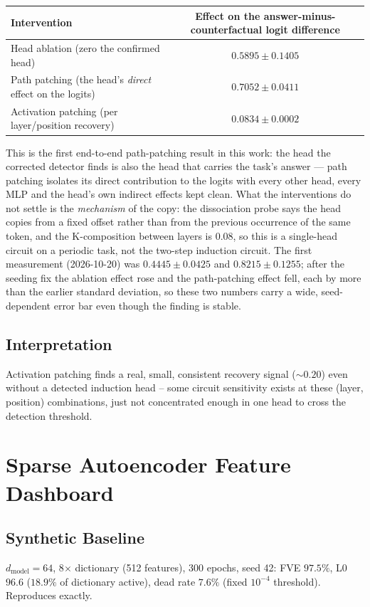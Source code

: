 \documentclass[11pt]{article}
\begin{document}
\begin{center}
\begin{tabular}{lc}
\toprule
Intervention & Effect on the answer-minus-counterfactual logit difference \\
\midrule
Head ablation (zero the confirmed head) & $0.5895 \pm 0.1405$ \\
Path patching (the head's \emph{direct} effect on the logits) & $0.7052 \pm 0.0411$ \\
Activation patching (per layer/position recovery) & $0.0834 \pm 0.0002$ \\
\bottomrule
\end{tabular}
\end{center}

This is the first end-to-end path-patching result in this work: the head
the corrected detector finds is also the head that carries the task's
answer --- path patching isolates its direct contribution to the logits with
every other head, every MLP and the head's own indirect effects kept clean.
What the interventions do not settle is the \emph{mechanism} of the copy: the
dissociation probe says the head copies from a fixed offset rather than from
the previous occurrence of the same token, and the K-composition between
layers is $0.08$, so this is a single-head circuit on a periodic task, not
the two-step induction circuit. The first measurement (2026-10-20) was $0.4445 \pm 0.0425$ and
$0.8215 \pm 0.1255$; after the seeding fix the ablation effect rose and the path-patching
effect fell, each by more than the earlier standard deviation, so these two numbers carry a wide,
seed-dependent error bar even though the finding is stable.

\subsection{Interpretation}
Activation patching finds a real, small, consistent recovery signal
($\sim 0.20$) even without a detected induction head -- some circuit
sensitivity exists at these (layer, position) combinations, just not
concentrated enough in one head to cross the detection threshold.

\section{Sparse Autoencoder Feature Dashboard}
\label{sec:sae}

\subsection{Synthetic Baseline}
$d_\text{model}=64$, 8$\times$ dictionary (512 features), 300 epochs,
seed 42: FVE $97.5\%$, L0 $96.6$ ($18.9\%$ of dictionary active), dead
rate $7.6\%$ (fixed $10^{-4}$ threshold). Reproduces exactly.
\end{document}

